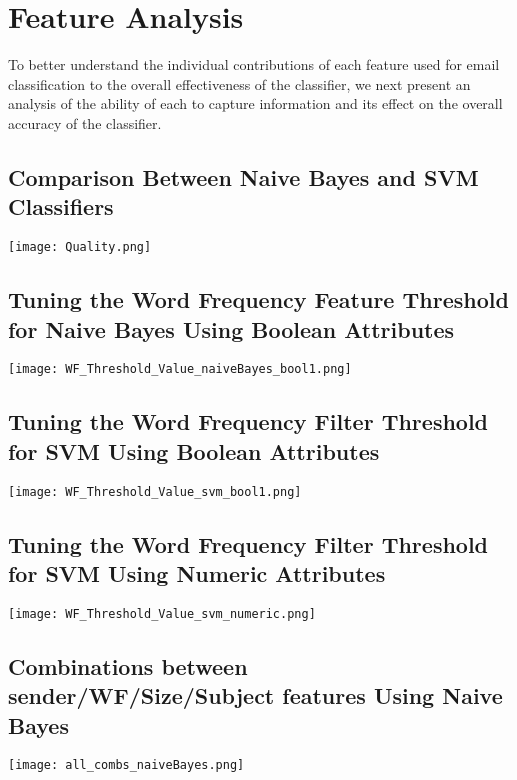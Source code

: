 
\chapter{Feature Analysis} %

\label{Chapter6} %



To better understand the individual contributions of each feature used for email classification to the overall eﬀectiveness of the classifier, we next present an analysis of the ability of each to capture information and its effect on the overall accuracy of the classifier.

\section{Comparison Between Naive Bayes and SVM Classifiers}
\texttt{[image: Quality.png]}

\section{Tuning the Word Frequency Feature Threshold for Naive Bayes Using Boolean Attributes}
\texttt{[image: WF\_Threshold\_Value\_naiveBayes\_bool1.png]}

\section{Tuning the Word Frequency Filter Threshold for SVM Using Boolean Attributes}
\texttt{[image: WF\_Threshold\_Value\_svm\_bool1.png]}

\section{Tuning the Word Frequency Filter Threshold for SVM Using Numeric Attributes}
\texttt{[image: WF\_Threshold\_Value\_svm\_numeric.png]}

\section{Combinations between sender/WF/Size/Subject features Using Naive Bayes}
\texttt{[image: all\_combs\_naiveBayes.png]}

